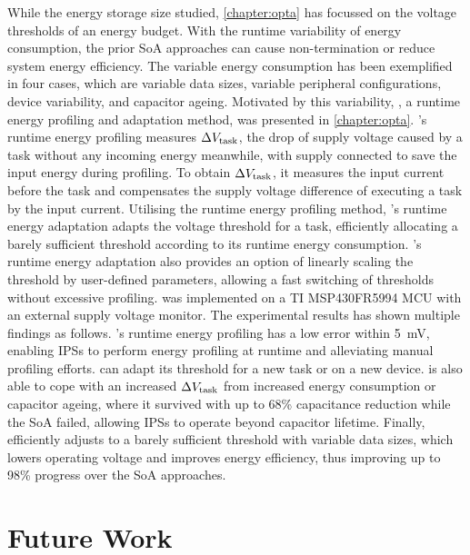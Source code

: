 While the energy storage size studied, \cref{chapter:opta} has focussed on the voltage thresholds of an energy budget. 
With the runtime variability of energy consumption, the prior SoA approaches can cause non-termination or reduce system energy efficiency.
The variable energy consumption has been exemplified in four cases, which are variable data sizes, variable peripheral configurations, device variability, and capacitor ageing. 
Motivated by this variability, \nn{}, a runtime energy profiling and adaptation method, was presented in \cref{chapter:opta}. 
\nn{}'s runtime energy profiling measures $\Delta V_{\text{task}}$, the drop of supply voltage caused by a task without any incoming energy meanwhile, with supply connected to save the input energy during profiling.
To obtain $\Delta V_{\text{task}}$, it measures the input current before the task and compensates the supply voltage difference of executing a task by the input current.
Utilising the runtime energy profiling method, \nn{}'s runtime energy adaptation adapts the voltage threshold for a task, efficiently allocating a barely sufficient threshold according to its runtime energy consumption. 
\nn{}'s runtime energy adaptation also provides an option of linearly scaling the threshold by user-defined parameters, allowing a fast switching of thresholds without excessive profiling. 
\nn{} was implemented on a TI MSP430FR5994 MCU with an external supply voltage monitor. 
The experimental results has shown multiple findings as follows.
\nn{}'s runtime energy profiling has a low error within \SI{5}{\milli\volt}, enabling IPSs to perform energy profiling at runtime and alleviating manual profiling efforts.
\nn{} can adapt its threshold for a new task or on a new device. 
\nn{} is also able to cope with an increased $\Delta V_{\text{task}}$ from increased energy consumption or capacitor ageing, where it survived with up to 68\% capacitance reduction while the SoA failed, allowing IPSs to operate beyond capacitor lifetime. 
Finally, \nn{} efficiently adjusts to a barely sufficient threshold with variable data sizes, which lowers operating voltage and improves energy efficiency, thus improving up to 98\% progress over the SoA approaches.


\section{Future Work}

